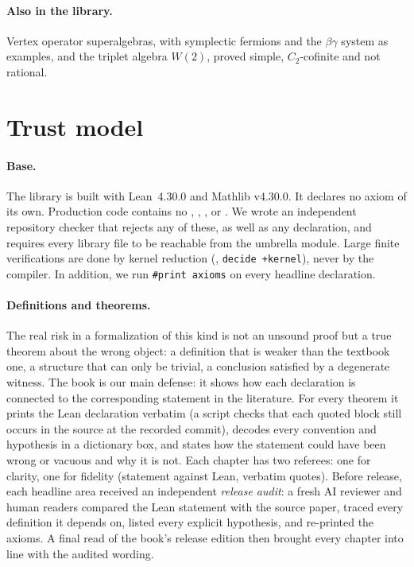 \documentclass[10pt]{article}
\begin{document}
\paragraph{Also in the library.} Vertex operator superalgebras, with symplectic fermions and the $\beta\gamma$
system as examples, and the triplet algebra $W(2)$, proved simple, $C_2$-cofinite and not rational.

\section{Trust model}\label{sec:trust}

\paragraph{Base.} The library is built with Lean~4.30.0 and Mathlib v4.30.0. It declares no axiom of its own.
Production code contains no , , ,  or
. We wrote an independent repository checker that rejects any of these, as well as any
 declaration, and requires every library file to be reachable from the umbrella module. Large finite
verifications are done by kernel reduction (, \texttt{decide +kernel}), never by the compiler. In addition,
we run \texttt{\#print axioms} on every headline declaration.

\paragraph{Definitions and theorems.} The real risk in a formalization of this kind is not an unsound proof but a true
theorem about the wrong object: a definition that is weaker than the textbook one, a structure that can only be
trivial, a conclusion satisfied by a degenerate witness.
The book is our main defense: it shows how each declaration is connected to the corresponding statement in the
literature.
For every theorem it prints the Lean declaration verbatim (a script checks that each
quoted block still occurs in the source at the recorded commit), decodes every convention and hypothesis in a
dictionary box, and states how the statement could have been wrong or vacuous and why it is not. Each chapter has
two referees: one for clarity, one for fidelity (statement against Lean, verbatim quotes). Before release, each
headline area received an independent \emph{release audit}: a fresh AI reviewer and human readers
compared the Lean statement with the source paper, traced every definition it depends on,
listed every explicit hypothesis, and re-printed the axioms. A final read of the book's release edition then brought every chapter into line with the audited wording.
\end{document}
